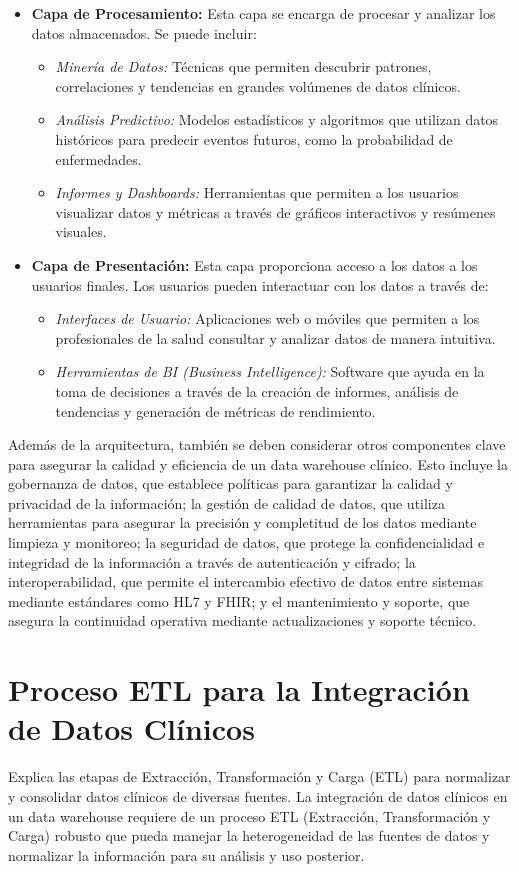 \documentclass[12pt, a4paper, twoside]{article}
\begin{document}
\begin{itemize}
		\item \textbf{Capa de Procesamiento:} Esta capa se encarga de procesar y analizar los datos almacenados. Se puede incluir:
		\begin{itemize}
			\item \textit{Minería de Datos:} Técnicas que permiten descubrir patrones, correlaciones y tendencias en grandes volúmenes de datos clínicos.
			\item \textit{Análisis Predictivo:} Modelos estadísticos y algoritmos que utilizan datos históricos para predecir eventos futuros, como la probabilidad de enfermedades.
			\item \textit{Informes y Dashboards:} Herramientas que permiten a los usuarios visualizar datos y métricas a través de gráficos interactivos y resúmenes visuales.
		\end{itemize}
		
		\item \textbf{Capa de Presentación:} Esta capa proporciona acceso a los datos a los usuarios finales. Los usuarios pueden interactuar con los datos a través de:
		\begin{itemize}
			\item \textit{Interfaces de Usuario:} Aplicaciones web o móviles que permiten a los profesionales de la salud consultar y analizar datos de manera intuitiva.
			\item \textit{Herramientas de BI (Business Intelligence):} Software que ayuda en la toma de decisiones a través de la creación de informes, análisis de tendencias y generación de métricas de rendimiento.
		\end{itemize}
	\end{itemize}
	
	
	Además de la arquitectura, también se deben considerar otros componentes clave para asegurar la calidad y eficiencia de un data warehouse clínico. Esto incluye la gobernanza de datos, que establece políticas para garantizar la calidad y privacidad de la información; la gestión de calidad de datos, que utiliza herramientas para asegurar la precisión y completitud de los datos mediante limpieza y monitoreo; la seguridad de datos, que protege la confidencialidad e integridad de la información a través de autenticación y cifrado; la interoperabilidad, que permite el intercambio efectivo de datos entre sistemas mediante estándares como HL7 y FHIR; y el mantenimiento y soporte, que asegura la continuidad operativa mediante actualizaciones y soporte técnico.
	
	
	\section{Proceso ETL para la Integración de Datos Clínicos}
	Explica las etapas de Extracción, Transformación y Carga (ETL) para normalizar y consolidar datos clínicos de diversas fuentes.
	La integración de datos clínicos en un data warehouse requiere de un proceso ETL (Extracción, Transformación y Carga) robusto que pueda manejar la heterogeneidad de las fuentes de datos y normalizar la información para su análisis y uso posterior.
	
\end{document}
